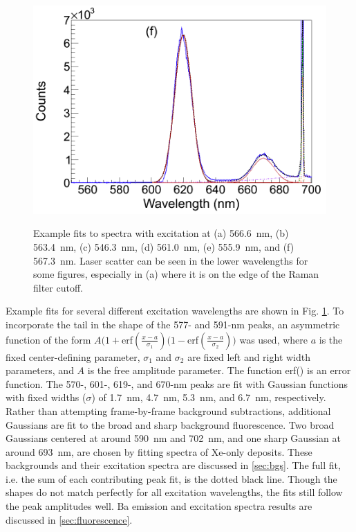 \begin{figure}
                ~
                \includegraphics[width=.5\textwidth]{figures/spectra_fit_f.png}
                \caption{Example fits to spectra with excitation at (a) 566.6~nm, (b) 563.4~nm, (c) 546.3~nm, (d) 561.0~nm, (e) 555.9~nm, and (f) 567.3~nm.  Laser scatter can be seen in the lower wavelengths for some figures, especially in (a) where it is on the edge of the Raman filter cutoff.}
\label{fig:specFitsGrn}
\end{figure}

Example fits for several different excitation wavelengths are shown in Fig. \ref{fig:specFitsGrn}.  To incorporate the tail in the shape of the 577- and 591-nm peaks, an asymmetric function of the form $A(1+$erf$(\frac{x-a}{\sigma_{1}})(1-$erf$(\frac{x-a}{\sigma_{2}}))$ was used, where $a$ is the fixed center-defining parameter, $\sigma_{1}$ and $\sigma_{2}$ are fixed left and right width parameters, and $A$ is the free amplitude parameter.  The function erf() is an error function.  The 570-, 601-, 619-, and 670-nm peaks are fit with Gaussian functions with fixed widths ($\sigma$) of 1.7~nm, 4.7~nm, 5.3~nm, and 6.7~nm, respectively.  Rather than attempting frame-by-frame background subtractions, additional Gaussians are fit to the broad and sharp background fluorescence.  Two broad Gaussians centered at around 590~nm and 702~nm, and one sharp Gaussian at around 693~nm, are chosen by fitting spectra of Xe-only deposits.  These backgrounds and their excitation spectra are discussed in \ref{sec:bgs}.  The full fit, i.e. the sum of each contributing peak fit, is the dotted black line.  Though the shapes do not match perfectly for all excitation wavelengths, the fits still follow the peak amplitudes well.  Ba emission and excitation spectra results are discussed in \ref{sec:fluorescence}.




